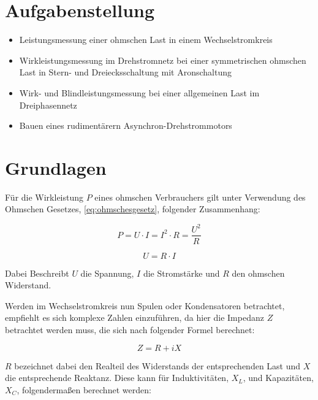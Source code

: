 \documentclass[12pt,english,ngerman]{scrartcl}
\begin{document}

\tableofcontents
\newpage

\section{Aufgabenstellung\label{Auf}}

\begin{itemize}
	\item Leistungsmessung einer ohmschen Last in einem Wechselstromkreis
	\item Wirkleistungsmessung im Drehstromnetz bei einer symmetrischen ohmschen Last in
	      Stern- und Dreiecksschaltung mit Aronschaltung
	\item Wirk- und Blindleistungsmessung bei einer allgemeinen Last im Dreiphasennetz
	\item Bauen eines rudimentärern Asynchron-Drehstrommotors
\end{itemize}

\section{Grundlagen}\label{Grund}

Für die Wirkleistung $P$ eines ohmschen Verbrauchers gilt unter Verwendung des
Ohmschen Gesetzes, \autoref{eq:ohmschesgesetz}, folgender Zusammenhang:

\begin{equation}
	P = U \cdot I = I^2 \cdot R = \frac{U^2}{R}
	\label{eq:leistung}
\end{equation}

\begin{equation}
	U = R \cdot I
	\label{eq:ohmschesgesetz}
\end{equation}

Dabei Beschreibt $U$ die Spannung, $I$ die Stromstärke und $R$ den ohmschen
Widerstand.

Werden im Wechselstromkreis nun Spulen oder Kondensatoren betrachtet, empfiehlt
es sich komplexe Zahlen einzuführen, da hier die Impedanz $Z$ betrachtet werden
muss, die sich nach folgender Formel berechnet:

\begin{equation}
	Z = R + iX
	\label{eq:Impedanz}
\end{equation}

$R$ bezeichnet dabei den Realteil des Widerstands der entsprechenden Last und $X$ die entsprechende Reaktanz.
Diese kann für Induktivitäten, $X_L$, und Kapazitäten, $X_C$, folgendermaßen berechnet werden:
\end{document}
